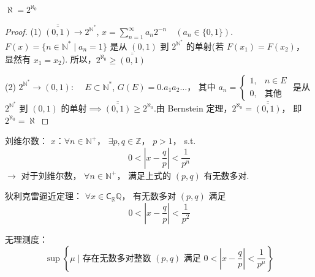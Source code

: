 \begin{theorem}
    \quad $\aleph = 2^{\aleph_0}$
\end{theorem}
\begin{proof}
(1) $\overline{\overline{(0, 1)}} \to 2^{\mathbb{N}^*}$, $x = \sum_{n=1}^\infty a_n 2^{-n} \quad (a_n \in \{0, 1\})$. $F(x) = \{ n \in \mathbb{N}^* \mid a_n = 1 \}$ 是从 $(0, 1)$ 到 $2^{\mathbb{N}^*}$ 的单射(若 $F(x_1) = F(x_2)$， 显然有 $x_1 = x_2$). 所以，$2^{\aleph_0} \ge \overline{\overline{(0, 1)}}$

(2) $2^{\mathbb{N}^*} \to (0, 1)$: $\quad E \subset \mathbb{N}^*$, $G(E) = 0.a_1a_2\dots$， 其中 $a_n = \begin{cases} 1, & n \in E \\ 0, & \text{其他} \end{cases}$ 是从 $2^{\mathbb{N}^*}$ 到 $(0, 1)$ 的单射$\implies \overline{\overline{(0, 1)}} \ge 2^{\aleph_0}$.由 Bernstein 定理，$2^{\aleph_0} = \overline{\overline{(0, 1)}}$， 即 $2^{\aleph_0} = \aleph$
\end{proof}

\vspace{1em}


\begin{notebox}
{\heiti 刘维尔数：} $x$：$\forall n \in \mathbb{N}^+$， $\exists p, q \in \mathbb{Z}$， $p > 1$，
s.t. $$0 < \left| x - \frac{q}{p} \right| < \frac{1}{p^n}$$
$\to$ 对于刘维尔数， $\forall n \in \mathbb{N}^+$，
满足上式的 $(p, q)$ 有无数多对. 
\end{notebox}


\vspace{1em}

\begin{notebox}
{\heiti 狄利克雷逼近定理：} $\forall x \in \mathsf{C}_{\mathbb{R}} \mathbb{Q}$，
有无数多对 $(p, q)$ 满足 $$0 < \left| x - \frac{q}{p} \right| < \frac{1}{p^2}$$

\end{notebox}

\vspace{1em}

\begin{notebox}
{\heiti 无理测度：}
$$\sup \left\{ \mu \mid \text{存在无数多对整数 } (p, q) \text{ 满足 } 0 < \left| x - \frac{q}{p} \right| < \frac{1}{p^\mu} \right\}$$
\end{notebox}

\vspace{1em}

